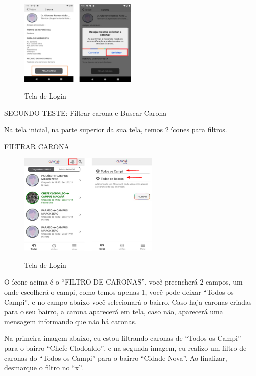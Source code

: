 \begin{figure}[H]
	\centering
	\caption{Tela de Login}
	\includegraphics[width=0.5\textwidth]{./04-figuras/manual/solicitacao_de_carona.png}
	\label{fig:solicitacao_de_carona_2}
\end{figure}

SEGUNDO TESTE: Filtrar carona e Buscar Carona

Na tela inicial, na parte superior da sua tela, temos 2 ícones para filtros.

FILTRAR CARONA

\begin{figure}[H]
	\centering
	\caption{Tela de Login}
	\includegraphics[width=0.6\textwidth]{./04-figuras/manual/filtrar_carona.png}
	\label{fig:filtrar_carona}
\end{figure}

O ícone acima é o “FILTRO DE CARONAS”, você preencherá 2 campos, um onde escolherá o campi, como temos apenas 1, você pode deixar “Todos os Campi”, e no campo abaixo você selecionará o bairro. Caso haja caronas criadas para o seu bairro, a carona aparecerá em tela, caso não, aparecerá uma mensagem informando que não há caronas.

Na primeira imagem abaixo, eu estou filtrando caronas de “Todos os Campi” para o bairro “Chefe Clodoaldo”, e na segunda imagem, eu realizo um filtro de caronas do “Todos os Campi” para o bairro “Cidade Nova”. Ao finalizar, desmarque o filtro no “x”.

